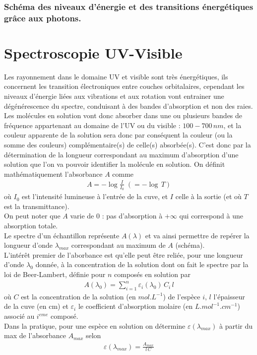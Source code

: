 \documentclass[12pt,prb,aps,epsf]{report}
\begin{document}
\subsubsection{Schéma des niveaux d'énergie et des transitions énergétiques grâce aux photons. }

\section{Spectroscopie UV-Visible}
Les rayonnement dans le domaine UV et visible sont très énergétiques, ils concernent les transition électroniques entre couches orbitalaires, cependant les niveaux d'énergie liées aux vibrations et aux rotation vont entrainer une dégénérescence du spectre, conduisant à des bandes d'absorption et non des raies. Les molécules en solution vont donc absorber dans une ou plusieurs bandes de fréquence appartenant au domaine de l'UV ou du visible : $100-700\,nm$, et la couleur apparente de la solution sera donc par conséquent la couleur (ou la somme des couleurs) complémentaire(s) de celle(s) absorbée(s). C'est donc par la détermination de la longueur correspondant au maximum d'absorption d'une solution que l'on va pouvoir identifier la molécule en solution. On définit mathématiquement l'absorbance $A$ comme 
\begin{eqnarray}
A = -\log{\frac{I}{I_0}} \;(=-\log\,T)
\end{eqnarray}
où $I_0$ est l'intensité lumineuse à l'entrée de la cuve, et $I$ celle à la sortie (et où $T$ est la transmittance).\\
On peut noter que $A$ varie de 0 : pas d'absorption à $+\infty$ qui correspond à une absorption totale.\\
Le spectre d'un échantillon représente $A(\lambda)$ et va ainsi permettre de repérer la longueur d'onde $\lambda_{max}$ correspondant au maximum de $A$ (schéma).\\
L'intérêt premier de l'aborbance est qu'elle peut être reliée, pour une longueur d'onde $\lambda_0$ donnée, à la concentration de la solution dont on fait le spectre par la loi de Beer-Lambert, définie pour $n$ composés en solution par 
\begin{eqnarray}
A(\lambda_0) = \sum_{i=1}^{n}\varepsilon_i(\lambda_0) \, C_i\,l
\end{eqnarray}
où $C$ est la concentration de la solution (en $mol.L^{-1}$) de l'espèce $i$, $l$ l'épaisseur de la cuve (en cm) et $\varepsilon_i$ le coefficient d'absorption molaire (en $L.mol^{-1}.cm^{-1}$) associé au $i^{eme}$ composé.\\
Dans la pratique, pour une espèce en solution on détermine $\varepsilon(\lambda_{max})$ à partir du max de l'absorbance $A_{max}$ selon 
\begin{eqnarray}
\varepsilon(\lambda_{max}) = \frac{A_{max}}{l\,C}
\end{eqnarray}
\end{document}
